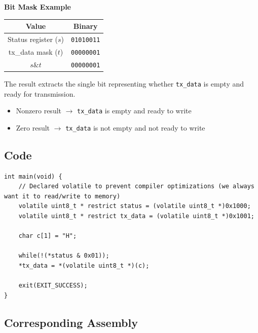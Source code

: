 \documentclass[14pt, a4paper]{article}
\begin{document}
\vspace{5mm}

\noindent
\textbf{Bit Mask Example}

\begin{center}
\begin{tabular}{c|c}
    \textbf{Value} & \textbf{Binary} \\
    \hline
    Status register ($s$) & \texttt{01010011} \\
    tx\_data mask ($t$) & \texttt{00000001} \\
    $s \mathbin{\&} t$ & \texttt{00000001}
\end{tabular}
\end{center}

\vspace{2mm}

\noindent
The result extracts the single bit representing whether
\texttt{tx\_data} is empty and ready for transmission.

\begin{itemize}
    \item Nonzero result $\rightarrow$ \texttt{tx\_data} is empty and ready to write
    \item Zero result $\rightarrow$ \texttt{tx\_data} is not empty and not ready to write
\end{itemize}

\newpage

\subsection*{Code}

\begin{lstlisting}[style=cstyle]
int main(void) {
    // Declared volatile to prevent compiler optimizations (we always want it to read/write to memory)
    volatile uint8_t * restrict status = (volatile uint8_t *)0x1000;
    volatile uint8_t * restrict tx_data = (volatile uint8_t *)0x1001;

    char c[1] = "H";

    while(!(*status & 0x01));
    *tx_data = *(volatile uint8_t *)(c);
    
    exit(EXIT_SUCCESS);
}
\end{lstlisting}

\subsection*{Corresponding Assembly}
\end{document}
